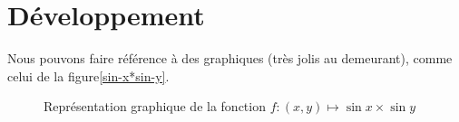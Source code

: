 \chapter{Développement}

Nous pouvons faire référence à des graphiques (très jolis au demeurant), comme
celui de la figure\vref{sin-x*sin-y}.
\lipsum[3-10]
\begin{figure}[ht]
  \centering
  \capstart
  \caption{Représentation graphique de la fonction $f:(x,y)\mapsto
    \sin x\times\sin y$}
  \label{sin-x*sin-y}
\end{figure}

